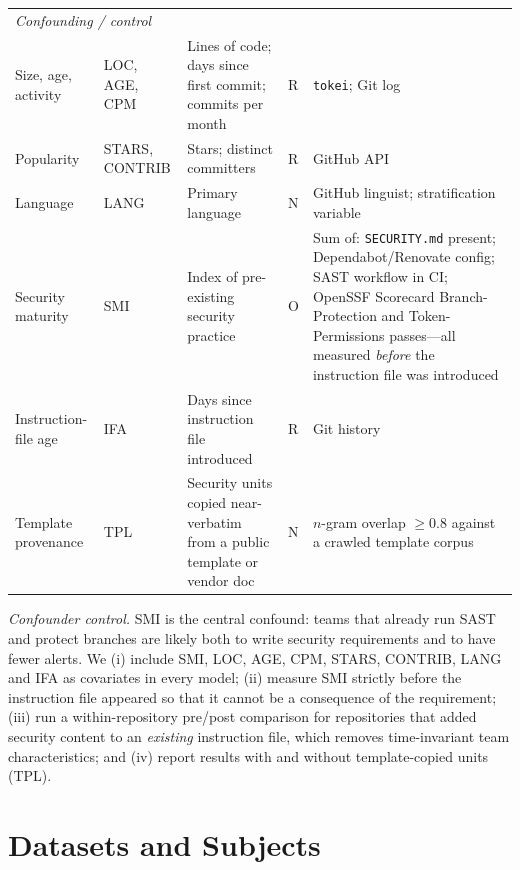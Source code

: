 \documentclass[10pt,conference]{IEEEtran}
\begin{document}
\begin{table}[t]
\begin{tabular}{p{1.9cm}p{1.2cm}p{5.6cm}p{0.6cm}p{6.4cm}}
\midrule
\multicolumn{5}{l}{\emph{Confounding / control}}\\
Size, age, activity & LOC, AGE, CPM & Lines of code; days since first commit; commits per month & R & \texttt{tokei}; Git log \\
Popularity & STARS, CONTRIB & Stars; distinct committers & R & GitHub API \\
Language & LANG & Primary language & N & GitHub linguist; stratification variable \\
Security maturity & SMI & Index of pre-existing security practice & O & Sum of: \texttt{SECURITY.md} present; Dependabot/Renovate config; SAST workflow in CI; OpenSSF Scorecard Branch-Protection and Token-Permissions passes---all measured \emph{before} the instruction file was introduced \\
Instruction-file age & IFA & Days since instruction file introduced & R & Git history \\
Template provenance & TPL & Security units copied near-verbatim from a public template or vendor doc & N & $n$-gram overlap $\geq0.8$ against a crawled template corpus \\
\bottomrule
\end{tabular}
\end{table}

\emph{Confounder control.} SMI is the central confound: teams that already run SAST and protect branches are likely both to write security requirements and to have fewer alerts. We (i) include SMI, LOC, AGE, CPM, STARS, CONTRIB, LANG and IFA as covariates in every model; (ii) measure SMI strictly before the instruction file appeared so that it cannot be a consequence of the requirement; (iii) run a within-repository pre/post comparison for repositories that added security content to an \emph{existing} instruction file, which removes time-invariant team characteristics; and (iv) report results with and without template-copied units (TPL).

\section{Datasets and Subjects}
\label{sec:data}
\end{document}
